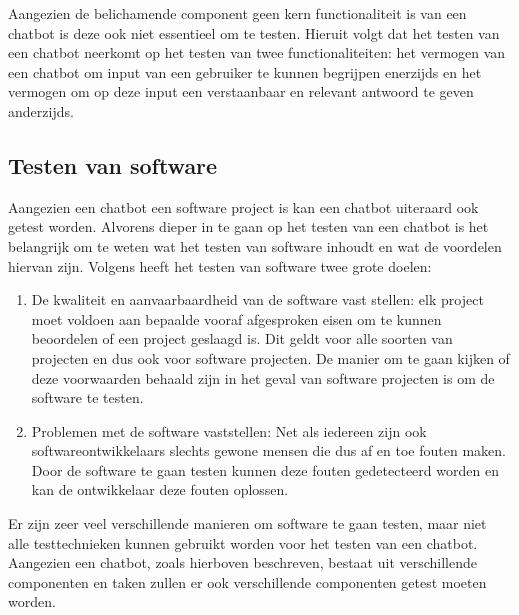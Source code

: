 Aangezien de belichamende component geen kern functionaliteit is van een chatbot is deze ook niet essentieel om te testen. Hieruit volgt dat het testen van een chatbot neerkomt op het testen van twee functionaliteiten: het vermogen van een chatbot om input van een gebruiker te kunnen begrijpen enerzijds en het vermogen om op deze input een verstaanbaar en relevant antwoord te geven  anderzijds.

\subsection{Testen van software}

Aangezien een chatbot een software project is kan een chatbot uiteraard ook getest worden. Alvorens dieper in te gaan op het testen van een chatbot is het belangrijk om te weten wat het testen van software inhoudt en wat de voordelen hiervan zijn. Volgens \textcite{Jorgensen2018} heeft het testen van software twee grote doelen:

\begin{enumerate}
    \item De kwaliteit en aanvaarbaardheid van de software vast stellen: 
    elk project moet voldoen aan bepaalde vooraf afgesproken eisen om te kunnen beoordelen of een project geslaagd is. Dit geldt voor alle soorten van projecten en dus ook voor software projecten. De manier om te gaan kijken of deze voorwaarden behaald zijn in het geval van software projecten is om de software te testen.
    \item Problemen met de software vaststellen:
    Net als iedereen zijn ook softwareontwikkelaars slechts gewone mensen die dus af en toe fouten maken. Door de software te gaan testen kunnen deze fouten gedetecteerd worden en kan de ontwikkelaar deze fouten oplossen.
\end{enumerate}

Er zijn zeer veel verschillende manieren om software te gaan testen, maar niet alle testtechnieken kunnen gebruikt worden voor het testen van een chatbot. Aangezien een chatbot, zoals hierboven beschreven, bestaat uit verschillende componenten en taken zullen er ook verschillende componenten getest moeten worden. 

